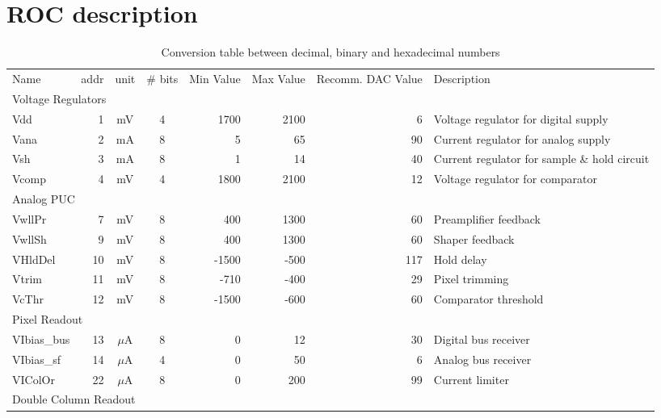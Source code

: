 \chapter{ROC description}

\begin{table}[h]
    \begin{center}
	\caption{Conversion table between decimal, binary and hexadecimal numbers}
	\label{tab:DecBinHex}

	\bigskip

	\begin{tabular}{lrccrrrl}
	\toprule
	Name & addr & unit & \# bits & Min Value & Max Value & Recomm. DAC Value & Description \\ 
	\multicolumn{ 8}{l}{Voltage Regulators} \\ 
	Vdd                   & 1 &   mV        & 4 & 1700 & 2100 & 6 & Voltage regulator for digital supply \\ 
	Vana                  & 2 &   mA        & 8 & 5 & 65 & 90 & Current regulator for analog supply \\ 
	Vsh                   & 3 &   mA        & 8 & 1 & 14 & 40 & Current regulator for sample \& hold circuit \\ 
	Vcomp                 & 4 &   mV        & 4 & 1800 & 2100 & 12 & Voltage regulator for comparator \\ 
	\multicolumn{ 8}{l}{Analog PUC} \\ 
	VwllPr                & 7 &   mV        & 8 & 400 & 1300 & 60 & Preamplifier feedback  \\ 
	VwllSh                & 9 &   mV        & 8 & 400 & 1300 & 60 & Shaper feedback \\ 
	VHldDel    & 10 &   mV        & 8 & -1500 & -500 & 117 & Hold delay \\ 
	Vtrim     & 11 &   mV        & 8 & -710 & -400 & 29 & Pixel trimming \\ 
	VcThr     & 12 &   mV        & 8 & -1500 & -600 & 60 & Comparator threshold \\ 
	\multicolumn{ 8}{l}{Pixel Readout} \\ 
	VIbias\_bus & 13 & $\mu$A & 8 & 0 & 12 & 30 & Digital bus receiver \\ 
	VIbias\_sf             & 14 & $\mu$A & 4 & 0 & 50 & 6 & Analog bus receiver \\ 
	VIColOr               & 22 & $\mu$A & 8 & 0 & 200 & 99 & Current limiter \\ 
	\multicolumn{ 8}{l}{Double Column Readout} \\ 

\end{tabular}
\end{center}
\end{table}
